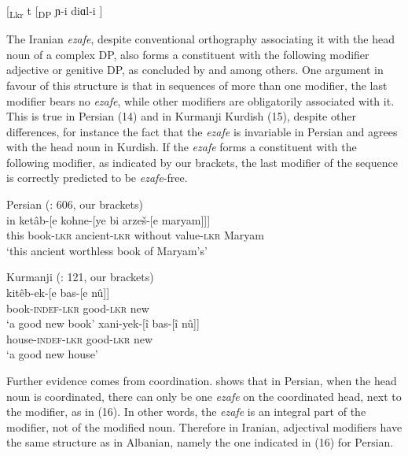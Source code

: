 \documentclass[output=paper]{langsci/langscibook}
\begin{document}
\ea%
    \label{ex:manzini:13}
    [\textsubscript{Lkr} t  [\textsubscript{DP} ɲ-i diɑl-i ]     
\z

The Iranian \textit{ezafe}, despite conventional orthography associating it with the head noun of a complex DP, also forms a constituent with the following modifier adjective or genitive DP, as concluded by \citet{Larson2008} and \citet{Philip2012} among others. One argument in favour of this structure is that in sequences of more than one modifier, the last modifier bears no \textit{ezafe}, while other modifiers are obligatorily associated with it. This is true in Persian (14) and in Kurmanji Kurdish (15), despite other differences, for instance the fact that the \textit{ezafe} is invariable in Persian and agrees with the head noun in Kurdish. If the \textit{ezafe} forms a constituent with the following modifier, as indicated by our brackets, the last modifier of the sequence is correctly predicted to be \textit{ezafe}{}-free. 

\ea%
         Persian (\citealt{Samvelian2007}: 606, our brackets)\label{ex:manzini:14}\\
    \gll in   ketâb-[e   kohne-[ye   bi arzeš-[e     maryam]]]\\
         this   book{}-\textsc{lkr}    ancient{}-\textsc{lkr}    without value{}-\textsc{lkr}    Maryam\\
    \glt ‘this ancient worthless book of Maryam’s’     
    \z

  
\ea%
    Kurmanji (\citealt{Yamakido2005}: 121, our brackets)\label{ex:manzini:15}\\
    \ea
    \gll kitêb-ek-[e    bas-[e    nû]]\\
         book-\textsc{indef-lkr}   good-\textsc{lkr}   new\\
    \glt ‘a good new book’
    \ex  
    \gll xani-yek-[î    bas-[î    nû]]\\
         house-\textsc{indef-lkr}   good-\textsc{lkr}   new\\
    \glt ‘a good new house’
    \z
\z    

Further evidence comes from coordination. \citet[37ff.]{Philip2012} shows that in Persian, when the head noun is coordinated, there can only be one \textit{ezafe} on the coordinated head, next to the modifier, as in (16). In other words, the \textit{ezafe} is an integral part of the modifier, not of the modified noun. Therefore in Iranian, adjectival modifiers have the same structure as in Albanian, namely the one indicated in (16) for Persian.
\end{document}
